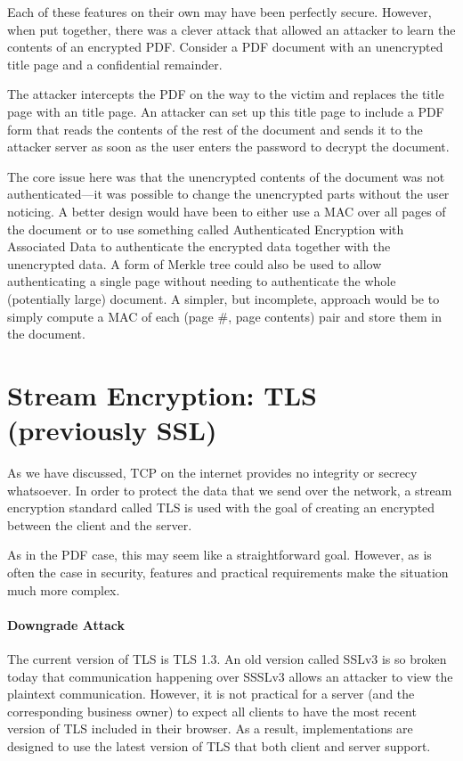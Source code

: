 Each of these features on their own may have been perfectly secure. However, when put together, there was a clever attack that allowed an attacker to learn the contents of an encrypted PDF. Consider a PDF document with an unencrypted title page and a confidential remainder. 

The attacker intercepts the PDF on the way to the victim and replaces the title page with an  title page. An attacker can set up this title page to include a PDF form that reads the contents of the rest of the document and sends it to the attacker server as soon as the user enters the password to decrypt the document.

The core issue here was that the unencrypted contents of the document was not authenticated---it was possible to change the unencrypted parts without the user noticing. A better design would have been to either use a MAC over all pages of the document or to use something called Authenticated Encryption with Associated Data to authenticate the encrypted data together with the unencrypted data. A form of Merkle tree could also be used to allow authenticating a single page without needing to authenticate the whole (potentially large) document. A simpler, but incomplete, approach would be to simply compute a MAC of each (page \#, page contents) pair and store them in the document.

\section{Stream Encryption: TLS (previously SSL)}
As we have discussed, TCP on the internet provides no integrity or secrecy whatsoever. In order to protect the data that we send over the network, a stream encryption standard called TLS is used with the goal of creating an encrypted  between the client and the server.

As in the PDF case, this may seem like a straightforward goal. However, as is often the case in security, features and practical requirements make the situation much more complex.

\paragraph{Downgrade Attack} The current version of TLS is TLS 1.3. An old version called SSLv3 is so broken today that communication happening over SSSLv3 allows an attacker to view the plaintext communication. However, it is not practical for a server (and the corresponding business owner) to expect all clients to have the most recent version of TLS included in their browser. As a result, implementations are designed to use the latest version of TLS that both client and server support.

